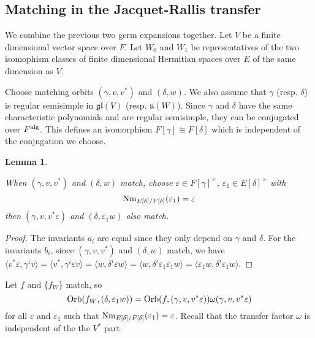 \documentclass[11pt, oneside,reqno]{amsart}   	%
\newtheorem{lemma}[theorem]{Lemma}
\begin{document}
\subsection{Matching in the Jacquet-Rallis transfer} \label{section Jacquet-Rallis} 

We combine the previous two germ expansions together. Let $V$ be a finite dimensional vector space over $F$. Let $W_0$ and $W_1$ be representatives of the two isomophism classes of finite dimensional Hermitian spaces over $E$ of the same dimension as $V$. 

Choose matching orbits $(\gamma, v, v^*)$ and $(\delta, w)$. We also assume that $\gamma$ (resp. $\delta$) is regular semisimple in $\mathfrak{gl}(V)$ (resp. $\mathfrak{u}(W)$). Since $\gamma$ and $\delta$ have the same characteristic polynomials and are regular semisimple, they can be conjugated over $F^{\textup{alg}}$. This defines an isomorphism $F[\gamma] \cong F[\delta]$ which is independent of the conjugation we choose.

\begin{lemma} \label{change match}

When $(\gamma, v, v^*)$ and $(\delta, w)$ match, choose $\varepsilon \in F[\gamma]^\times$, $\varepsilon_1 \in E[\delta]^\times$ with$$ \textup{Nm}_{E[\delta]/F[\delta]}(\varepsilon_1)=\varepsilon$$ then $(\gamma, v,  v^*\varepsilon)$ and $(\delta, \varepsilon_1 w)$ also match. 

\end{lemma}
\begin{proof}
The invariants $a_i$ are equal since they only depend on $\gamma$ and $\delta$. For the invariants $b_i$, since $(\gamma, v, v^*)$ and $(\delta, w)$ match, we have $\langle v^*\varepsilon, \gamma^iv\rangle=\langle v^*, \gamma^i \varepsilon v\rangle=\langle w, \delta^i \varepsilon w \rangle=\langle w, \delta^i \varepsilon_1\overline{\varepsilon_1}w \rangle=\langle \varepsilon_1w, \delta^i \varepsilon_1w \rangle$.



 
\end{proof}



Let $f$ and \{$f_W$\} match, so
 $$\textup{Orb}(f_W,(\delta, \varepsilon_1 w))=\textup{Orb}(f,(\gamma, v,  v^*\varepsilon))\omega(\gamma,v, v^*\varepsilon)$$
for all $ \varepsilon$ and $\varepsilon_1$ such that $\textup{Nm}_{E[\delta]/F[\delta]}(\varepsilon_1)=\varepsilon$. Recall that the transfer factor $\omega$ is independent of the the $V^*$ part.
\end{document}
